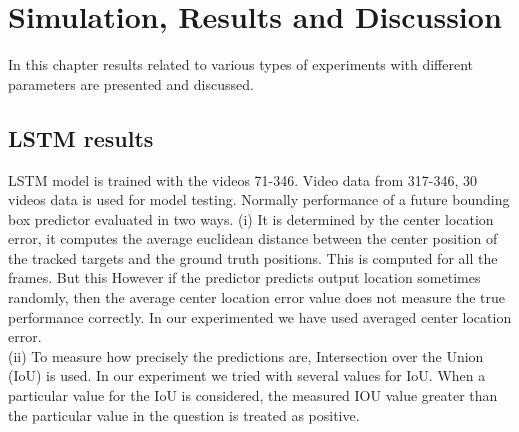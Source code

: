 \chapter{Simulation, Results and Discussion}
In this chapter results related to various types of experiments with different parameters are presented and discussed.

\section{LSTM results}
LSTM model is trained with the videos 71-346. Video data from 317-346, 30 videos data is used for model testing. Normally performance of a future bounding box predictor evaluated  in two ways. 
(i) It is determined by the center location error, it computes the average
euclidean distance between the center position of the tracked targets and the ground truth
positions. This is computed for all the frames. But this However if the predictor predicts 
output location sometimes randomly, then the average center location error value does not measure the
true performance correctly. In our experimented we have used averaged center location error. \\

(ii) To measure how precisely the predictions are, Intersection over the Union (IoU) is used. In our experiment we tried with several values for IoU. When a particular value for the IoU is considered, the measured IOU value greater than the particular value in the question is treated as positive.


